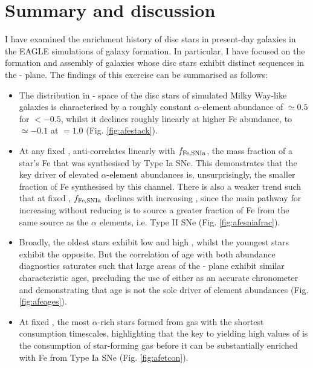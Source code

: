 \section{Summary and discussion}
\label{sec:summary_and_discussion}

I have examined the enrichment history of disc stars in present-day galaxies in the EAGLE simulations of galaxy formation. In particular, I have focused on the formation and assembly of galaxies whose disc stars exhibit distinct sequences in the \afe{}-\feh{} plane. The findings of this exercise can be summarised as follows:

\begin{itemize}

\item The distribution in \afe{}-\feh{} space of the disc stars of simulated Milky Way-like galaxies is characterised by a roughly constant $\alpha$-element abundance of \afe{}$\simeq 0.5$ for \feh{}$< -0.5$, whilst it declines roughly linearly at higher Fe abundance, to \afe{}$\simeq -0.1$ at \feh{}$=1.0$ (Fig. \ref{fig:afestack}).

\item At any fixed \feh{}, \afe{} anti-correlates linearly with $f_{\rm Fe,SNIa}$, the mass fraction of a star's Fe that was synthesised by Type Ia SNe. This demonstrates that the key driver of elevated $\alpha$-element abundances is, unsurprisingly, the smaller fraction of Fe synthesised by this channel. There is also a weaker trend such that at fixed \afe{}, $f_{\rm Fe,SNIa}$ declines with increasing \feh{}, since the main pathway for increasing \feh{} without reducing \afe{} is to source a greater fraction of Fe from the same source as the $\alpha$ elements, i.e. Type II SNe (Fig. \ref{fig:afesniafrac}).

\item Broadly, the oldest stars exhibit low \feh{} and high \afe{}, whilst the youngest stars exhibit the opposite. But the correlation of age with both abundance diagnostics saturates such that large areas of the \afe{}-\feh{} plane exhibit similar characteristic ages, precluding the use of either as an accurate chronometer and demonstrating that age is not the sole driver of element abundances (Fig. \ref{fig:afeages}).

\item At fixed \feh{}, the most $\alpha$-rich stars formed from gas with the shortest consumption timescales, highlighting that the key to yielding high values of \afe{} is the consumption of star-forming gas before it can be substantially enriched with Fe from Type Ia SNe (Fig. \ref{fig:afetcon}).


\end{itemize}
